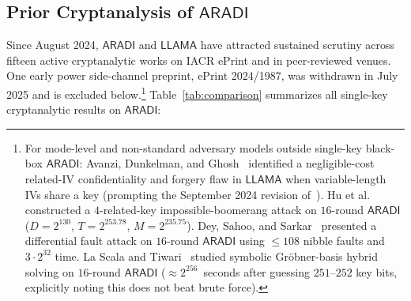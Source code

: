 \documentclass[11pt,a4paper]{article}
\theoremstyle{definition}
\theoremstyle{remark}
\newcommand{\ARADI}{\mathsf{ARADI}}
\newcommand{\LLAMA}{\mathsf{LLAMA}}
\begin{document}
\subsection{Prior Cryptanalysis of \texorpdfstring{$\ARADI$}{ARADI}}
Since August 2024, $\ARADI$ and $\LLAMA$ have attracted sustained scrutiny across fifteen active cryptanalytic works on IACR ePrint and in peer-reviewed venues. One early power side-channel preprint, ePrint 2024/1987, was withdrawn in July 2025 and is excluded below.\footnote{For mode-level and non-standard adversary models outside single-key black-box $\ARADI$: Avanzi, Dunkelman, and Ghosh~\cite{ADG24} identified a negligible-cost related-IV confidentiality and forgery flaw in $\LLAMA$ when variable-length IVs share a key (prompting the September 2024 revision of~\cite{GMW24}). Hu et al.~\cite{HJF25} constructed a $4$-related-key impossible-boomerang attack on $16$-round $\ARADI$ ($D = 2^{130}$, $T = 2^{253.78}$, $M = 2^{235.75}$). Dey, Sahoo, and Sarkar~\cite{DSS25} presented a differential fault attack on $16$-round $\ARADI$ using $\le 108$ nibble faults and $3 \cdot 2^{32}$ time. La Scala and Tiwari~\cite{LST26,LST25b} studied symbolic Gröbner-basis hybrid solving on $16$-round $\ARADI$ ($\approx 2^{256}$~seconds after guessing $251$--$252$ key bits, explicitly noting this does not beat brute force).} Table~\ref{tab:comparison} summarizes all single-key cryptanalytic results on $\ARADI$:
\end{document}
